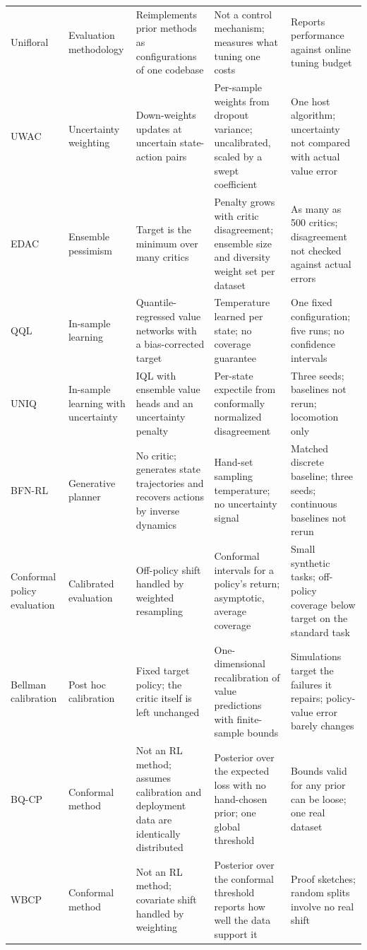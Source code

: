 \documentclass[conference]{IEEEtran}
\begin{document}
\begin{table}[!t]
\begin{tabularx}{\textwidth}{@{}P{0.105\textwidth}P{0.095\textwidth}LLL@{}}
Unifloral \cite{jackson2025unifloral} & Evaluation methodology & Reimplements prior methods as configurations of one codebase & Not a control mechanism; measures what tuning one costs & Reports performance against online tuning budget \\
UWAC \cite{wu2021uwac} & Uncertainty weighting & Down-weights updates at uncertain state-action pairs & Per-sample weights from dropout variance; uncalibrated, scaled by a swept coefficient & One host algorithm; uncertainty not compared with actual value error \\
EDAC \cite{an2021edac} & Ensemble pessimism & Target is the minimum over many critics & Penalty grows with critic disagreement; ensemble size and diversity weight set per dataset & As many as 500 critics; disagreement not checked against actual errors \\
QQL \cite{gao2026qql} & In-sample learning & Quantile-regressed value networks with a bias-corrected target & Temperature learned per state; no coverage guarantee & One fixed configuration; five runs; no confidence intervals \\
UNIQ \cite{upadhyay2026uniq} & In-sample learning with uncertainty & IQL with ensemble value heads and an uncertainty penalty & Per-state expectile from conformally normalized disagreement & Three seeds; baselines not rerun; locomotion only \\
BFN-RL \cite{killingberg2026bfn} & Generative planner & No critic; generates state trajectories and recovers actions by inverse dynamics & Hand-set sampling temperature; no uncertainty signal & Matched discrete baseline; three seeds; continuous baselines not rerun \\
Conformal policy evaluation \cite{gan2025conformal} & Calibrated evaluation & Off-policy shift handled by weighted resampling & Conformal intervals for a policy's return; asymptotic, average coverage & Small synthetic tasks; off-policy coverage below target on the standard task \\
Bellman calibration \cite{vanderlaan2026bellman} & Post hoc calibration & Fixed target policy; the critic itself is left unchanged & One-dimensional recalibration of value predictions with finite-sample bounds & Simulations target the failures it repairs; policy-value error barely changes \\
BQ-CP \cite{snell2025bqcp} & Conformal method & Not an RL method; assumes calibration and deployment data are identically distributed & Posterior over the expected loss with no hand-chosen prior; one global threshold & Bounds valid for any prior can be loose; one real dataset \\
WBCP \cite{lou2026wbcp} & Conformal method & Not an RL method; covariate shift handled by weighting & Posterior over the conformal threshold reports how well the data support it & Proof sketches; random splits involve no real shift \\
\bottomrule
\end{tabularx}
\end{table}
\end{document}
